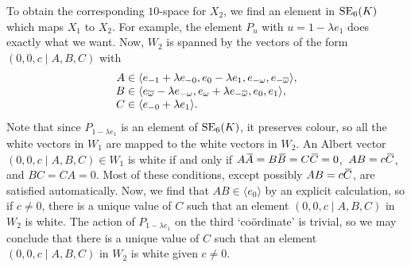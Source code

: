 To obtain the corresponding $10$-space for $X_2$, we 
find an element in $\mathrm{SE}_6(K)$ which maps $X_1$ to $X_2$. For example, the element 
$P_u$ with $u = 1 - \lambda e_1$ does exactly what we want. Now, $W_2$ is spanned
by the vectors of the form $(0,0,c \mid A,B,C)$ with
\begin{equation}
	\begin{array}{r@{\;}c@{\;}l}
		A & \in & \langle e_{-1}+\lambda e_{-0}, e_0 - \lambda e_1, e_{-\omega}, e_{-\bar{\omega}}
					\rangle, \\
					
		B & \in & \langle e_{\bar{\omega}}-\lambda e_{-\omega}, e_{\omega} + \lambda e_{-\bar{\omega}},
					e_0, e_1 \rangle, \\
					
		C & \in & \langle e_{-0} + \lambda e_1 \rangle.
	\end{array}
\end{equation}
Note that since $P_{1-\lambda e_1}$ is an element of $\mathrm{SE}_6(K)$, it preserves colour, so all the 
white vectors in $W_1$ are mapped to the white vectors in $W_2$.
An Albert vector \mbox{$(0,0,c \mid A,B,C) \in W_1$} is white if and only if
 \mbox{$A\ovA = B\ovB = C\ovC = 0$, $AB = c\mathord{\mbox{\hspace*{0pt}}\,\overline{\!C\!\!\;}\!\:}\mbox{\hspace*{0pt}}$}, and $BC = CA = 0$. Most of these conditions,
except possibly $AB = c\mathord{\mbox{\hspace*{0pt}}\,\overline{\!C\!\!\;}\!\:}\mbox{\hspace*{0pt}}$, are satisfied automatically. Now, we find that $AB \in \langle e_0
\rangle$ by an explicit calculation, so if $c \neq 0$, there is a unique value of $C$ such that 
an element $(0,0,c \mid A,B,C)$ in $W_2$ is white. The action of $P_{1-\lambda e_1}$ on the third 
`co\"{o}rdinate' is trivial, so we may conclude that there is a unique value of $C$ such that 
an element $(0,0,c \mid A,B,C)$ in $W_2$ is white given $c \neq 0$. 

